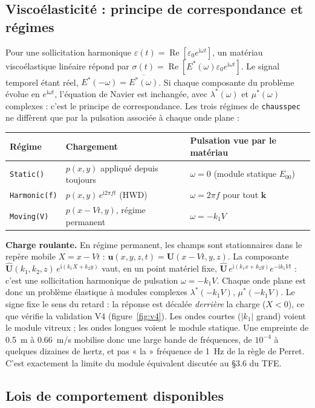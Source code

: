 \documentclass[11pt,a4paper]{article}
\newcommand{\ii}{\mathrm{i}}
\newcommand{\hatt}[1]{\widehat{#1}}
\newcommand{\cs}{\texttt{chausspec}}
\renewcommand{\epsilon}{\varepsilon}
\begin{document}
\subsection{Viscoélasticité : principe de correspondance et régimes}\label{sec:corresp}
Pour une sollicitation harmonique $\epsilon(t)=\operatorname{Re}[\epsilon_0e^{\ii\omega t}]$, un
matériau viscoélastique linéaire répond par $\sigma(t)=\operatorname{Re}[E^*(\omega)\epsilon_0e^{\ii\omega t}]$.
Le signal temporel étant réel, $E^*(-\omega)=\overline{E^*(\omega)}$.
Si chaque composante du problème évolue en $e^{\ii\omega t}$, l'équation de Navier est inchangée,
avec $\lambda^*(\omega)$ et $\mu^*(\omega)$ complexes : c'est le principe de correspondance. Les
trois régimes de \cs{} ne diffèrent que par la pulsation associée à chaque onde plane :
\begin{center}
\begin{tabular}{lll}
\toprule
Régime & Chargement & Pulsation vue par le matériau\\
\midrule
\texttt{Static()} & $p(x,y)$ appliqué depuis toujours & $\omega=0$ (module statique $E_{00}$)\\
\texttt{Harmonic(f)} & $p(x,y)\,e^{\ii 2\pi f t}$ (HWD) & $\omega=2\pi f$ pour tout $\bm k$\\
\texttt{Moving(V)} & $p(x-Vt,y)$, régime permanent & $\omega=-k_1V$\\
\bottomrule
\end{tabular}
\end{center}
\textbf{Charge roulante.} En régime permanent, les champs sont stationnaires dans le repère
mobile $X=x-Vt$ : $\bm u(x,y,z,t)=\bm U(x-Vt,y,z)$. La composante
$\hatt{\bm U}(k_1,k_2,z)\,e^{\ii(k_1X+k_2y)}$ vaut, en un point matériel fixe,
$\hatt{\bm U}\,e^{\ii(k_1x+k_2y)}e^{-\ii k_1Vt}$ : c'est une sollicitation harmonique de pulsation
$\omega=-k_1V$. Chaque onde plane est donc un problème élastique à modules complexes
$\lambda^*(-k_1V)$, $\mu^*(-k_1V)$. Le signe fixe le sens du retard : la réponse est décalée
\emph{derrière} la charge ($X<0$), ce que vérifie la validation V4 (figure~\ref{fig:v4}).
Les ondes courtes ($|k_1|$ grand) voient le module vitreux ; les ondes longues voient le module
statique. Une empreinte de \SI{0.5}{m} à \SI{0.66}{m/s} mobilise donc une large bande de
fréquences, de $10^{-4}$ à quelques dizaines de hertz, et pas « la » fréquence de \SI{1}{Hz} de la
règle de Perret. C'est exactement la limite du module équivalent discutée au \S3.6 du TFE.

\subsection{Lois de comportement disponibles}
\end{document}

